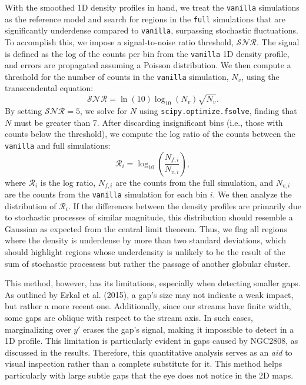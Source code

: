\documentclass[draft]{aa}
\begin{document}
      With the smoothed 1D density profiles in hand, we treat the \texttt{vanilla} simulations as the reference model and search for regions in the \texttt{full} simulations that are significantly underdense compared to \texttt{vanilla}, surpassing stochastic fluctuations. To accomplish this, we impose a signal-to-noise ratio threshold, $\mathcal{SNR}$. The signal is defined as the log of the counts per bin from the \texttt{vanilla} 1D density profile, and errors are propagated assuming a Poisson distribution. We then compute a threshold for the number of counts in the \texttt{vanilla} simulation, $N_v$, using the transcendental equation:
      \begin{equation}
          \mathcal{SNR} = \ln(10) \log_{10}\left(N_v\right) \sqrt{N_v}.
        \end{equation} \label{eq:density_threshold}
      By setting $\mathcal{SNR} = 5$, we solve for $N$ using \texttt{scipy.optimize.fsolve}, finding that $N$ must be greater than 7. After discarding insignificant bins (i.e., those with counts below the threshold), we compute the log ratio of the counts between the \texttt{vanilla} and full simulations:
      \begin{equation}
          \mathcal{R}_i = \log_{10}\left(\frac{N_{f,i}}{N_{v,i}}\right),
        \end{equation}
      where $\mathcal{R}_i$ is the log ratio, $N_{f,i}$ are the counts from the full simulation, and $N_{v,i}$ are the counts from the \texttt{vanilla} simulation for each bin $i$. We then analyze the distribution of $\mathcal{R}_i$. If the differences between the density profiles are primarily due to stochastic processes of similar magnitude, this distribution should resemble a Gaussian as expected from the central limit theorem. Thus, we flag all regions where the density is underdense by more than two standard deviations, which should highlight regions whose underdensity is unlikely to be the result of the sum of stochastic processess but rather the passage of another globular cluster. 

      This method, however, has its limitations, especially when detecting smaller gaps. As outlined by Erkal et al. (2015), a gap's size may not indicate a weak impact, but rather a more recent one. Additionally, since our streams have finite width, some gaps are oblique with respect to the stream axis. In such cases, marginalizing over $y'$ erases the gap's signal, making it impossible to detect in a 1D profile. This limitation is particularly evident in gaps caused by NGC2808, as discussed in the results. Therefore, this quantitative analysis serves as an \textit{aid} to visual inspection rather than a complete substitute for it. This method helps particularly with large subtle gaps that the eye does not notice in the 2D maps.
\end{document}
